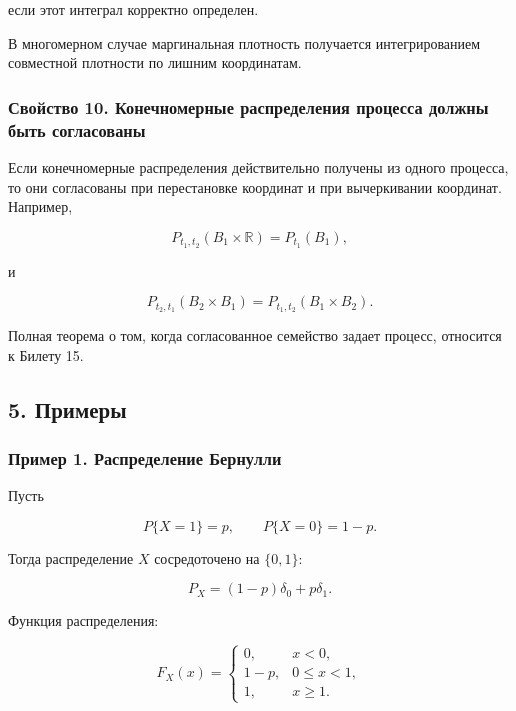 \documentclass[
  11pt,
  a4paper,
]{article}
\begin{document}
если этот интеграл корректно определен.

В многомерном случае маргинальная плотность получается интегрированием
совместной плотности по лишним координатам.

\subsubsection{Свойство 10. Конечномерные распределения процесса должны
быть
согласованы}\label{ux441ux432ux43eux439ux441ux442ux432ux43e-10.-ux43aux43eux43dux435ux447ux43dux43eux43cux435ux440ux43dux44bux435-ux440ux430ux441ux43fux440ux435ux434ux435ux43bux435ux43dux438ux44f-ux43fux440ux43eux446ux435ux441ux441ux430-ux434ux43eux43bux436ux43dux44b-ux431ux44bux442ux44c-ux441ux43eux433ux43bux430ux441ux43eux432ux430ux43dux44b}

Если конечномерные распределения действительно получены из одного
процесса, то они согласованы при перестановке координат и при
вычеркивании координат. Например,

\[
P_{t_1,t_2}(B_1\times\mathbb R)=P_{t_1}(B_1),
\]

и

\[
P_{t_2,t_1}(B_2\times B_1)=P_{t_1,t_2}(B_1\times B_2).
\]

Полная теорема о том, когда согласованное семейство задает процесс,
относится к Билету 15.

\subsection{5. Примеры}\label{ux43fux440ux438ux43cux435ux440ux44b}

\subsubsection{Пример 1. Распределение
Бернулли}\label{ux43fux440ux438ux43cux435ux440-1.-ux440ux430ux441ux43fux440ux435ux434ux435ux43bux435ux43dux438ux435-ux431ux435ux440ux43dux443ux43bux43bux438}

Пусть

\[
P\{X=1\}=p,\qquad P\{X=0\}=1-p.
\]

Тогда распределение \(X\) сосредоточено на \(\{0,1\}\):

\[
P_X=(1-p)\delta_0+p\delta_1.
\]

Функция распределения:

\[
F_X(x)=
\begin{cases}
0, & x<0,\\
1-p, & 0\le x<1,\\
1, & x\ge1.
\end{cases}
\]
\end{document}
